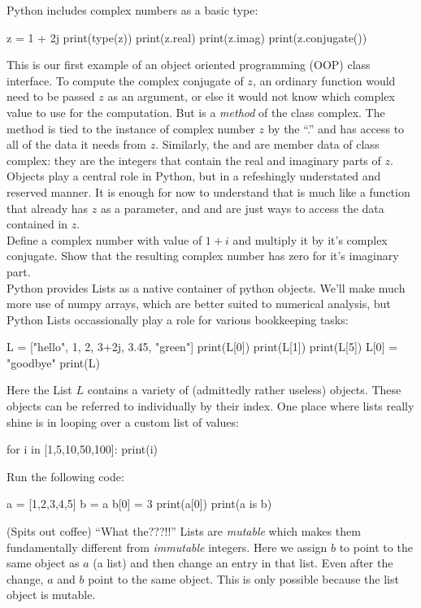 Python includes complex numbers as a basic type:
\begin{python}
  z = 1 + 2j
  print(type(z))
  print(z.real)
  print(z.imag)
  print(z.conjugate())
\end{python}
This is our first example of an object oriented programming (OOP)
class interface.  To compute the complex conjugate of $z$, an ordinary
function would need to be passed $z$ as an argument, or else it would
not know which complex value to use for the computation.  But
 is a {\em method} of the class complex.  The
method is tied to the instance of complex number $z$ by the ``.'' and
has access to all of the data it needs from $z$.  Similarly,
the  and  are member data of class complex: they
are the integers that contain the real and imaginary parts of $z$.
Objects play a central role in Python, but in a refeshingly
understated and reserved manner.  It is enough for now to understand
that  is much like a function that already has $z$
as a parameter, and  and  are just ways to
access the data contained in $z$.\\

\plot Define a complex number with value of $1+i$ and multiply it by
it's complex conjugate.  Show that the resulting complex number has
zero for it's imaginary part.\\

Python provides Lists as a native container of python objects.  We'll
make much more use of numpy arrays, which are better suited to
numerical analysis, but Python Lists occassionally play a role for various
bookkeeping tasks:
\begin{python}
L = ["hello", 1, 2, 3+2j, 3.45, "green"]
print(L[0])
print(L[1])
print(L[5])
L[0] = "goodbye"
print(L)
\end{python}
Here the List $L$ contains a variety of (admittedly rather useless)
objects.  These objects can be referred to individually by their
index.  One place where lists really shine is in looping over a
custom list of values:
\begin{python}
for i in [1,5,10,50,100]:
    print(i)
\end{python}

\vskip 0.25cm
\plot Run the following code:
\begin{python}
  a = [1,2,3,4,5]
  b = a
  b[0] = 3
  print(a[0])
  print(a is b)
\end{python}
(Spits out coffee) ``What the???!!''  Lists are {\em mutable} which makes
them fundamentally different from {\em immutable} integers.  Here
we assign $b$ to point to the same object as $a$ (a list) and then
change an entry in that list.  Even after the change, $a$ and $b$
point to the same object.  This is only possible because the list
object is mutable. \\

